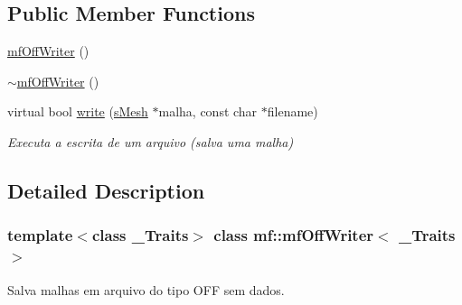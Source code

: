 \subsection*{Public Member Functions}
\begin{DoxyCompactItemize}
\item 
\hyperlink{classmf_1_1mfOffWriter_a70b0c81bf8c8a8837d0eb3868381796d}{mfOffWriter} ()
\item 
\hyperlink{classmf_1_1mfOffWriter_a6cd3f70c44f588ef1ba08f8dfaf89a98}{$\sim$mfOffWriter} ()
\item 
virtual bool \hyperlink{classmf_1_1mfOffWriter_ad3fe52bf8870c31c1b9f71431a56af8a}{write} (\hyperlink{classmf_1_1mfOffWriter_a5dee9306e438bf1819fb9823f6123b5c}{sMesh} $\ast$malha, const char $\ast$filename)
\begin{DoxyCompactList}\small\item\em Executa a escrita de um arquivo (salva uma malha) \item\end{DoxyCompactList}\end{DoxyCompactItemize}


\subsection{Detailed Description}
\subsubsection*{template$<$class \_\-Traits$>$ class mf::mfOffWriter$<$ \_\-Traits $>$}

Salva malhas em arquivo do tipo OFF sem dados. 

